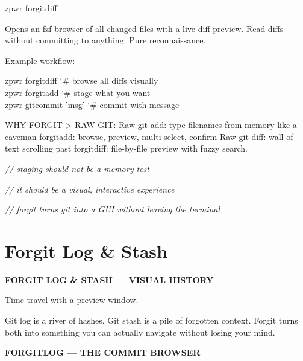 \documentclass[11pt,a4paper,twoside]{book}
\begin{document}
\begin{codebox}
\color{neongreen}zpwr forgitdiff\\
\end{codebox}

Opens an fzf browser of all changed files with a live diff preview. Read diffs without committing to anything. Pure reconnaissance.

Example workflow:

\begin{codebox}
\color{neongreen}zpwr forgitdiff           {\char`\#} browse all diffs visually\\
\color{neongreen}zpwr forgitadd            {\char`\#} stage what you want\\
\color{neongreen}zpwr gitcommit 'msg'      {\char`\#} commit with message\\
\end{codebox}

WHY FORGIT > RAW GIT: Raw git add:     type filenames from memory like a caveman forgitadd:       browse, preview, multi-select, confirm Raw git diff:    wall of text scrolling past forgitdiff:      file-by-file preview with fuzzy search.

{\small\itshape\color{dimtext} // staging should not be a memory test}

{\small\itshape\color{dimtext} // it should be a visual, interactive experience}

{\small\itshape\color{dimtext} // forgit turns git into a GUI without leaving the terminal}


\vspace{16pt}

\section{Forgit Log \& Stash}


\vspace{10pt}
{\large\bfseries\color{neoncyan} FORGIT LOG \& STASH — VISUAL HISTORY}\vspace{6pt}

Time travel with a preview window.

Git log is a river of hashes. Git stash is a pile of forgotten context. Forgit turns both into something you can actually navigate without losing your mind.


\vspace{12pt}
{\bfseries\color{neonyellow} FORGITLOG — THE COMMIT BROWSER}\vspace{4pt}
\end{document}
